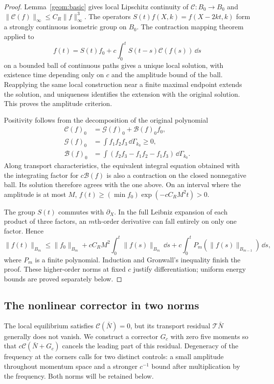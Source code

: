 \begin{proof}
 Lemma~\ref{geom:basic} gives local Lipschitz continuity of
 $\mathcal C:B_0\to B_0$ and
 $\|\mathcal C(f)\|_\infty\le C_R\|f\|_\infty^3$.
 The operators $S(t)f(X,k)=f(X-2kt,k)$ form a strongly continuous
 isometric group on $B_0$. The contraction mapping theorem applied to
 \[
 f(t)=S(t)f_0+c\int_0^tS(t-s)\mathcal C(f(s))\,\dd s
 \]
 on a bounded ball of continuous paths gives a unique local solution,
 with existence time depending only on $c$ and the amplitude bound of
 the ball. Reapplying the same local construction near a finite maximal
 endpoint extends the solution, and uniqueness identifies the extension
 with the original solution. This proves the amplitude criterion.

 Positivity follows from the decomposition of the original polynomial
 \begin{align*}
 \mathcal C(f)_0&=\mathcal G(f)_0+\mathcal B(f)_0 f_0,\\
 \mathcal G(f)_0&=\int f_1f_2f_3\,\dd\Gamma_{k_0}\ge0,\\
 \mathcal B(f)_0&=\int(f_2f_3-f_1f_2-f_1f_3)\,\dd\Gamma_{k_0}.
 \end{align*}
 Along transport characteristics, the equivalent integral equation
 obtained with the integrating factor for $c\mathcal B(f)$ is also a
 contraction on the closed nonnegative ball. Its solution therefore
 agrees with the one above. On an interval where the amplitude is at
 most $M$,
 $f(t)\ge(\min f_0)\exp(-cC_RM^2t)>0$.

 The group $S(t)$ commutes with $\partial_X$. In the full Leibniz
 expansion of each product of three factors, an $m$th-order derivative
 can fall entirely on only one factor. Hence
 \[
 \|f(t)\|_{B_m}\le\|f_0\|_{B_m}
   +cC_RM^2\int_0^t\|f(s)\|_{B_m}\,\dd s
   +c\int_0^tP_m(\|f(s)\|_{B_{m-1}})\,\dd s,
 \]
 where $P_m$ is a finite polynomial. Induction and Gronwall's inequality
 finish the proof. These higher-order norms at fixed $c$ justify
 differentiation; uniform energy bounds are proved separately below.
\end{proof}

\subsection{The nonlinear corrector in two norms}
\label{hyd:cell-section}

The local equilibrium satisfies $\mathcal C(\bar N)=0$, but its transport
residual $\mathcal T\bar N$ generally does not vanish. We construct a
corrector $G_c$ with zero five moments so that
$c\mathcal C(\bar N+G_c)$ cancels the leading part of this residual.
Degeneracy of the frequency at the corners calls for two distinct
controls: a small amplitude throughout momentum space and a stronger
$c^{-1}$ bound after multiplication by the frequency. Both norms will
be retained below.

